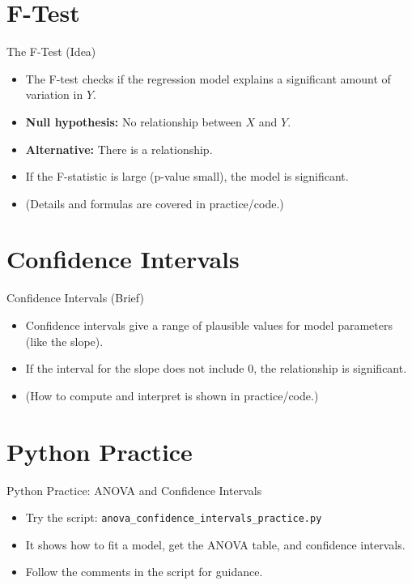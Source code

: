 \documentclass[aspectratio=169]{beamer}
\begin{document}
\section{F-Test}
\begin{frame}{The F-Test (Idea)}
  \begin{itemize}
    \item The F-test checks if the regression model explains a significant amount of variation in $Y$.
    \item \textbf{Null hypothesis:} No relationship between $X$ and $Y$.
    \item \textbf{Alternative:} There is a relationship.
    \item If the F-statistic is large (p-value small), the model is significant.
    \item (Details and formulas are covered in practice/code.)
  \end{itemize}
\end{frame}

\section{Confidence Intervals}
\begin{frame}{Confidence Intervals (Brief)}
  \begin{itemize}
    \item Confidence intervals give a range of plausible values for model parameters (like the slope).
    \item If the interval for the slope does not include 0, the relationship is significant.
    \item (How to compute and interpret is shown in practice/code.)
  \end{itemize}
\end{frame}

\section{Python Practice}
\begin{frame}{Python Practice: ANOVA and Confidence Intervals}
  \begin{itemize}
    \item Try the script: \texttt{anova\_confidence\_intervals\_practice.py}
    \item It shows how to fit a model, get the ANOVA table, and confidence intervals.
    \item Follow the comments in the script for guidance.
  \end{itemize}
\end{frame}
\end{document}
